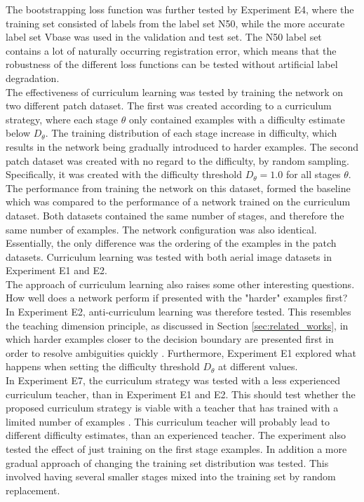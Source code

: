 The bootstrapping loss function was further tested by Experiment E4, where the training set consisted of labels from the label set N50, while the more accurate label set Vbase was used in the validation and test set. The N50 label set contains a lot of naturally occurring registration error, which means that the robustness of the different loss functions can be tested without artificial label degradation.\\

The effectiveness of curriculum learning was tested by training the network on two different patch dataset. The first was created according to a curriculum strategy, where each stage $\theta$ only contained examples with a difficulty estimate below $D_\theta$. The training distribution of each stage increase in difficulty, which results in the network being gradually introduced to harder examples. The second patch dataset was created with no regard to the difficulty, by random sampling. Specifically, it was created with the difficulty threshold $D_\theta =1.0$ for all stages $\theta$. The performance from training the network on this dataset, formed the baseline which was compared to the performance of a network trained on the curriculum dataset. Both datasets contained the same number of stages, and therefore the same number of examples. The network configuration was also identical. Essentially, the only difference was the ordering of the examples in the patch datasets. Curriculum learning was tested with both aerial image datasets in Experiment E1 and E2.\\

The approach of curriculum learning also raises some other interesting questions. How well does a network perform if presented with the "harder" examples first? In Experiment E2, anti-curriculum learning was therefore tested. This resembles the teaching dimension principle, as discussed in Section \ref{sec:related_works}, in which harder examples closer to the decision boundary are presented first in order to resolve ambiguities quickly . Furthermore, Experiment E1 explored what happens when setting the difficulty threshold $D_\theta$ at different values.\\

In Experiment E7, the curriculum strategy was tested with a less experienced curriculum teacher, than in Experiment E1 and E2. This should test whether the proposed curriculum strategy is viable with a teacher that has trained with a limited number of examples . This curriculum teacher will probably lead to different difficulty estimates, than an experienced teacher. The experiment also tested the effect of just training on the first stage examples. In addition a more gradual approach of changing the training set distribution was tested. This involved having several smaller stages mixed into the training set by random replacement.\\

